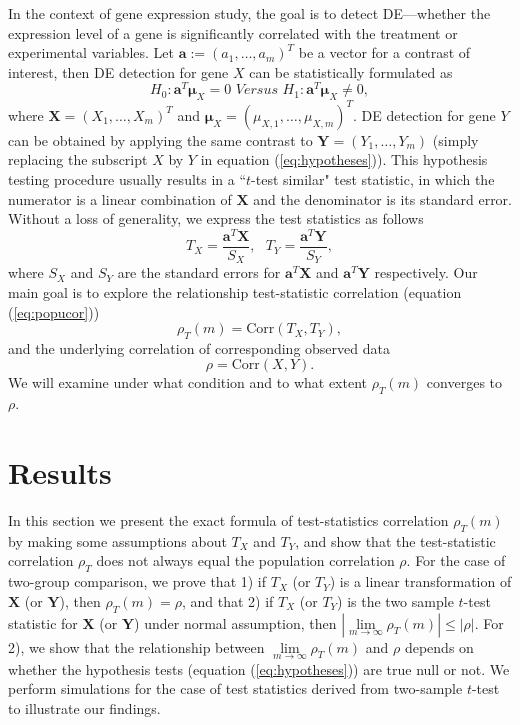 \documentclass[12pt, a4paper]{article}
\newcommand{\cor}{\text{Corr}}
\begin{document}
	In the context of gene expression study, the goal is to detect DE---whether the expression 
	level of a gene is significantly correlated with the treatment or experimental variables. Let 
	$\bm a:=(a_1, \ldots, a_m)^T$ be a vector for a contrast of interest, then DE detection for 
	gene $X$ can be statistically formulated as 
	\begin{equation}\label{eq:hypotheses}
	H_{0}:  \bm a^T\bm \mu_X = 0 \textit{     Versus   }  H_{1}: \bm a^T\bm \mu_X \neq 0,
	\end{equation}
	where $\bm X = (X_1, \ldots, X_m)^T$ and $\bm \mu_{X} = (\mu_{X, 1}, \ldots, \mu_{X, m})^T$.  
	DE detection for gene $Y$ can be obtained by applying the same contrast to $\bm Y = (Y_1, 
	\ldots, Y_m)$ (simply replacing the subscript $X$ by $Y$ in equation (\ref{eq:hypotheses})).
	This hypothesis testing procedure usually results in a ``$t$-test similar" test statistic, in 
	which the numerator is a linear combination of $\bm X$ and the denominator is its standard 
	error. Without a loss of generality, we express the test statistics as follows
	\begin{equation}\label{eq:teststat}
	T_X = \dfrac{\bm a^T\bm X}{S_X},  ~~~ T_Y = \dfrac{\bm a^T \bm Y}{S_Y},
	\end{equation}  
	where $S_X$ and $S_Y$ are the standard errors for $\bm a^T\bm X$ and $\bm a^T\bm Y$ 
	respectively. Our main goal is to explore the relationship test-statistic correlation (equation 
	(\ref{eq:popucor}))
	\begin{equation}
	\rho_T(m)= \cor({T_X, T_Y}) ,
	\end{equation}  
	and the underlying correlation of corresponding observed data 
	\begin{equation}
	\rho = \cor(X, Y). 
	\end{equation}
	We will examine under what condition and to what extent $\rho_T(m)$ converges to $\rho$.%
	
	
	\section{Results}\label{section:tcorresults}
	
	In this section we present the exact formula of test-statistics correlation $\rho_T(m)$ by 
	making some assumptions about $T_X$ and $T_Y$, and show that the test-statistic correlation 
	$\rho_T$ does not always equal the population correlation $\rho$. For the case of two-group 
	comparison, we prove that 1) if $T_X$ (or $T_Y$) is a linear transformation of $\bm X$ (or $\bm 
	Y$), then $\rho_T(m)= \rho$, and that 2) if $T_X$ (or $T_Y$) is the 
	two sample $t$-test 
	statistic 
	for $\bm X$ (or $\bm Y$) under normal assumption, then 
	$|\lim\limits_{m\rightarrow\infty}\rho_T(m)| 
	\leq |\rho|$. For 2), we show 
	that the relationship between 
	$\lim\limits_{m\rightarrow\infty}\rho_T(m)$ and $\rho$ depends on whether the hypothesis tests 
	(equation (\ref{eq:hypotheses})) are 
	true null or not. We perform simulations for the case of test statistics derived from 
	two-sample $t$-test to illustrate our findings.
	
\end{document}
